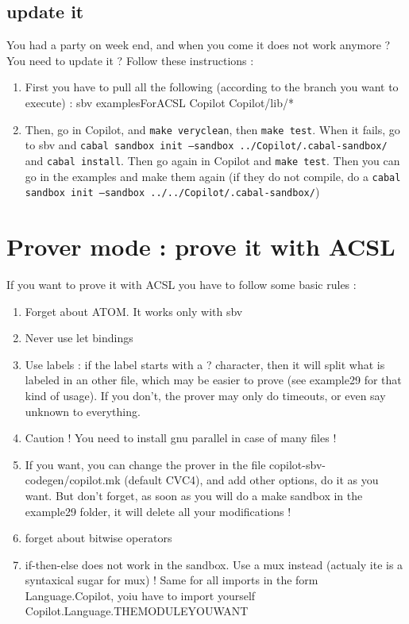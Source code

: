 \documentclass[11pt]{article}
\begin{document}
\subsection{update it}

You had a party on week end, and when you come it does not work anymore ? You need to update it ? Follow these instructions :

\begin{enumerate}
\item First you have to pull all the following (according to the branch you want to execute) :
\subitem sbv
\subitem examplesForACSL
\subitem Copilot
\subitem Copilot/lib/*
\item Then, go in Copilot, and \texttt{make veryclean}, then \texttt{make test}. When it fails, go to sbv and \texttt{cabal sandbox init --sandbox ../Copilot/.cabal-sandbox/} and \texttt{cabal install}. Then go again in Copilot and \texttt{make test}. Then you can go in the examples and make them again (if they do not compile, do a \texttt{cabal sandbox init --sandbox ../../Copilot/.cabal-sandbox/})
\end{enumerate}

\section {Prover mode : prove it with ACSL}

If you want to prove it with ACSL you have to follow some basic rules :
\begin{enumerate}
\item Forget about ATOM. It works only with sbv
\item Never use let bindings
\item Use labels : if the label starts with a ? character, then it will split what is labeled in an other file, which may be easier to prove (see example29 for that kind of usage). If you don't, the prover may only do timeouts, or even say unknown to everything.
\item Caution ! You need to install gnu parallel in case of many files !
\item If you want, you can change the prover in the file copilot-sbv-codegen/copilot.mk (default CVC4), and add other options, do it as you want. But don't forget, as soon as you will do a make sandbox in the example29 folder, it will delete all your modifications !
\item forget about bitwise operators
\item if-then-else does not work in the sandbox. Use a mux instead (actualy ite is a syntaxical sugar for mux) ! Same for all imports in the form Language.Copilot, yoiu have to import yourself Copilot.Language.THEMODULEYOUWANT
\end{enumerate}
\end{document}
